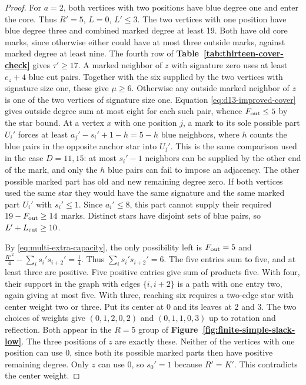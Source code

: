 \documentclass[preprint,11pt,numbers]{elsarticle-arxiv}
\numberwithin{equation}{section}
\theoremstyle{definition}
\begin{document}
\begin{proof}
For $a=2$, both vertices with two positions have blue degree one
and enter the core. Thus $R'=5$, $L=0$, $L'\le3$. The two vertices
with one position have blue degree three and combined marked degree at
least 19. Both have old core marks, since otherwise either could have
at most three outside marks, against marked degree at least nine.
The fourth row of \textbf{Table~\ref{tab:thirteen-cover-check}} gives $\tau'\ge17$. A marked
neighbor of $z$ with signature zero uses at least $e_z+4$ blue
cut pairs. Together with the six supplied by the two vertices with
signature size one, these give $\mu\ge6$. Otherwise any
outside marked neighbor of $z$ is one of the two vertices
of signature size one.
Equation \eqref{eq:d13-improved-cover} gives outside degree sum at
most eight for each such pair, whence $F_{\rm out}\le5$ by the star
bound. At a vertex $x$ with one position $j$, a mark to its sole
possible part $U_i'$ forces at least
$a_j'-s_i'+1-h=5-h$ blue neighbors, where $h$ counts the blue pairs
in the opposite anchor star into $U_j'$. This is the same comparison
used in the case $D=11,15$: at most $s_i'-1$ neighbors can be
supplied by the other end of the mark, and only the $h$ blue
pairs can fail to impose an adjacency. The other possible marked
part has old and new remaining degree zero. If both vertices used
the same star they would have the same signature and the same marked
part $U_i'$ with $s_i'\le1$. Since $a_i'\le8$, this part cannot
supply their required $19-F_{\rm out}\ge14$ marks. Distinct stars
have disjoint sets of blue pairs, so $L'+L_{\rm cut}\ge10$.

By \eqref{eq:multi-extra-capacity}, the only possibility left is
$F_{\rm out}=5$ and
$\frac{R'^2}{4}-\sum_i s_i's_{i+2}'=\frac{1}{4}$. Thus $\sum_i s_i's_{i+2}'=6$.
The five entries sum to five, and at least three are positive.
Five positive entries give sum of products five. With four, their
support in the graph with edges $\{i,i+2\}$ is a path with one entry
two, again giving at most five. With three, reaching six requires a
two-edge star with center weight two or three. Put its center at 0
and its leaves at 2 and 3. The two choices of weights give
$(0,1,2,0,2)$ and $(0,1,1,0,3)$ up to rotation and reflection. Both
appear in the $R=5$ group of \textbf{Figure~\ref{fig:finite-simple-slack-low}}.
The three positions of $z$ are exactly
these. Neither of the vertices with one position can use 0, since
both its possible marked parts then have positive remaining degree.
Only $z$ can use 0, so $s_0'=1$ because $R'=K'$. This contradicts
the center weight.


\end{proof}
\end{document}
